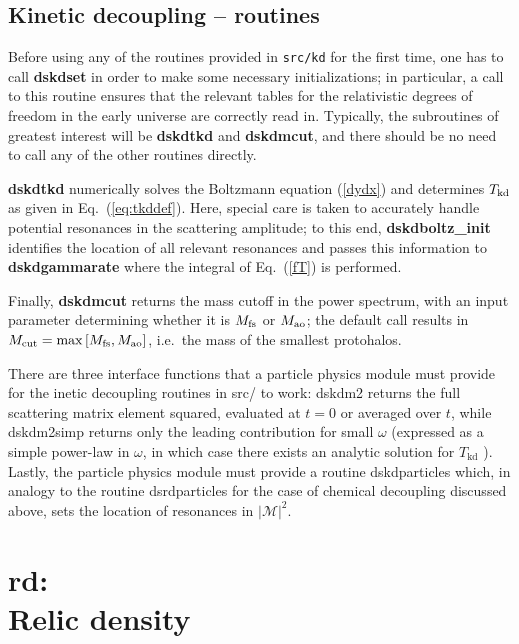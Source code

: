 \documentclass[a4paper,10pt,oneside]{book}
\newcommand{\code}[1]{\ft{#1}}
\newcommand{\codeb}[1]{\ftb{#1}}
\newcommand{\ft}[1]{\textsf{#1}}
\newcommand{\ftb}[1]{{\bfseries \sffamily #1}}
\begin{document}
\section{Kinetic decoupling -- routines}

Before using any of the routines provided in {\tt src/kd} for the first time, one has to 
call \ftb{dskdset} in order to make some necessary initializations; in particular, a call
to this routine ensures that the relevant tables for the relativistic degrees of freedom in the
early universe are correctly read in. Typically, the subroutines of greatest interest will be 
\ftb{dskdtkd} and \ftb{dskdmcut}, and there should be no need to call any of the other routines directly.

\ftb{dskdtkd} numerically solves the Boltzmann equation (\ref{dydx}) and determines
$T_{\rm kd}$ as given in Eq.~(\ref{eq:tkddef}). Here, special care is taken to 
accurately handle potential resonances in the scattering amplitude; to this end, 
\ftb{dskdboltz\_init} identifies the location of all relevant resonances and passes this
information to \ftb{dskdgammarate} where the integral of Eq.~(\ref{fT}) is performed.

Finally, \ftb{dskdmcut} returns the mass cutoff in the power spectrum, with an input parameter 
determining whether it is $M_{\rm fs}$ or $M_{\rm ao}$; the default call results in 
$M_{\rm cut}=\max\left[M_{\rm fs},M_{\rm ao}\right]$, i.e.~the mass of 
the smallest protohalos.

There are three interface functions that a particle physics module must provide for the inetic
decoupling routines in \code{src/} to work: \code{dskdm2} returns the full scattering matrix element squared, evaluated 
at $t=0$ or averaged over $t$, while \code{dskdm2simp} returns only the leading contribution
for small $\omega$ (expressed as a simple power-law in $\omega$, in which case there exists an
analytic solution for $T_\mathrm{kd}$ \cite{Bringmann:2006mu}). Lastly, the particle physics
module must provide a routine \code{dskdparticles} which, in analogy to the routine  \code{dsrdparticles}
for the case of chemical decoupling
discussed above, sets the location of resonances in $\left|\mathcal{M}\right|^2$.
\chapter[rd: Relic density]{\codeb{rd}:\\ Relic density}
\label{ch:src/rd}
\end{document}
